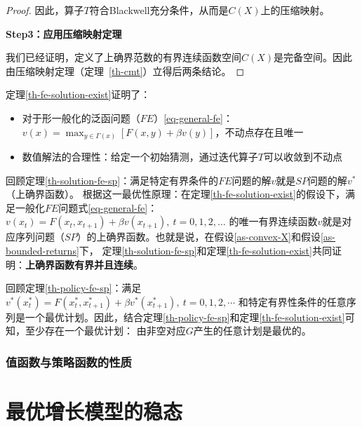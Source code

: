 \begin{proof}
    因此，算子$T$符合Blackwell充分条件，从而是$C\left(X\right)$上的压缩映射。

    \textbf{Step3：应用压缩映射定理}

    我们已经证明，定义了上确界范数的有界连续函数空间$C(X)$是完备空间。因此由压缩映射定理（定理~\ref{th-cmt}）立得后两条结论。
\end{proof}

定理\ref{th-fe-solution-exist}证明了：
\begin{itemize}
    \item 对于形一般化的泛函问题（$FE$）\ref{eq-general-fe}：
        $v\left(x\right)=\max_{y\in\Gamma\left(x\right)}\left[F\left(x,y\right)+\beta v\left(y\right)\right]$，不动点存在且唯一
    \item 数值解法的合理性：给定一个初始猜测，通过迭代算子$T$可以收敛到不动点
\end{itemize}

回顾定理\ref{th-solution-fe-sp}：满足特定有界条件的$FE$问题的解$v$就是$SP$问题的解$v^*$（上确界函数）。
根据这一最优性原理：在定理\ref{th-fe-solution-exist}的假设下，满足一般化$FE$问题式\ref{eq-general-fe}：
$v\left(x_t\right)=F\left(x_t, x_{t+1}\right)+\beta v\left(x_{t+1}\right), ~ t=0,1,2, \ldots$
的唯一有界连续函数$v$就是对应序列问题（$SP$）的上确界函数。也就是说，在假设\ref{as-convex-X}和假设\ref{as-bounded-returns}下，
定理\ref{th-solution-fe-sp}和定理\ref{th-fe-solution-exist}共同证明：\textbf{上确界函数有界并且连续}。

回顾定理\ref{th-policy-fe-sp}：满足
$v^*\left(x_t^*\right) = F\left(x_t^*,x_{t+1}^*\right) + \beta v^*\left(x_{t+1}^*\right), ~ t=0,1,2,\cdots$
和特定有界性条件的任意序列是一个最优计划。因此，结合定理\ref{th-policy-fe-sp}和定理\ref{th-fe-solution-exist}可知，至少存在一个最优计划：
由非空对应$G$产生的任意计划是最优的。


\subsubsection{值函数与策略函数的性质}



\section{最优增长模型的稳态}

